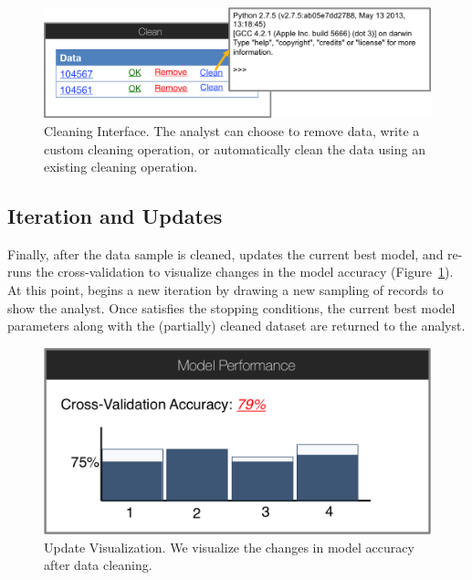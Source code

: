 \begin{figure}[t]
\centering
 \includegraphics[width=\columnwidth]{figs/interface4.png}
 \caption{Cleaning Interface. The analyst can choose to remove data, write a custom cleaning operation, or automatically clean the data using an existing cleaning operation.}
\end{figure}

\subsection{Iteration and Updates}
Finally, after the data sample is cleaned, \sys updates the current best model, and re-runs the cross-validation to visualize changes in the model accuracy (Figure~\ref{modelacc}).
At this point, \sys begins a new iteration by drawing a new sampling of records to show the analyst.  
Once \sys satisfies the stopping conditions, the current best model parameters along with the (partially) cleaned dataset are returned to the analyst.


\begin{figure}[t]
\centering
 \includegraphics[width=0.4\columnwidth]{figs/interface5.png}
 \caption{Update Visualization. We visualize the changes in model accuracy after data cleaning.}\label{modelacc}
\end{figure}